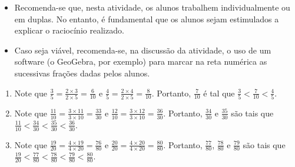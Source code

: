 \begin{orientacoes}{}{}

\begin{itemize} %
    \item       Recomenda-se que, nesta atividade, os alunos trabalhem
individualmente ou em duplas. No entanto, é fundamental que os alunos sejam
estimulados a explicar o raciocínio realizado.
    \item       Caso seja viável, recomenda-se, na discussão da atividade, o uso
de um software (o GeoGebra, por exemplo) para marcar na reta numérica as
sucessivas frações dadas pelos alunos.
\end{itemize} %




\end{orientacoes}

\begin{solucao}{}{}
\begin{enumerate} [\quad a)] %
    \item       Note que       $\frac{3}{5} = \frac{2 \times 3}{2 \times 5} =
\frac{6}{10}$       e       $\frac{4}{5} = \frac{2 \times 4}{2 \times 5} =
\frac{8}{10}$. Portanto,       $\frac{7}{10}$       é tal que       $\frac{3}{5}
< \frac{7}{10} < \frac{4}{5}$.
    \item       Note que       $\frac{11}{10} = \frac{3 \times 11}{3 \times 10}
= \frac{33}{30}$       e       $\frac{12}{10} = \frac{3 \times 12}{3 \times 10}
= \frac{36}{30}$. Portanto,       $\frac{34}{30}$       e       $\frac{35}{30}$
     são tais que       $\frac{11}{10} < \frac{34}{30} < \frac{35}{30} <
\frac{36}{30}$.
    \item       Note que       $\frac{19}{20} = \frac{4 \times 19}{4 \times 20}
= \frac{76}{80}$       e       $\frac{20}{20} = \frac{4 \times 20}{4 \times 20}
= \frac{80}{80}$. Portanto,       $\frac{77}{80}$,       $\frac{78}{80}$       e
      $\frac{79}{80}$       são tais que       $\frac{19}{20} < \frac{77}{80} <
\frac{78}{80} < \frac{79}{80} < \frac{80}{80}$.
\end{enumerate} %

\end{solucao}
\Bg
\Bg



